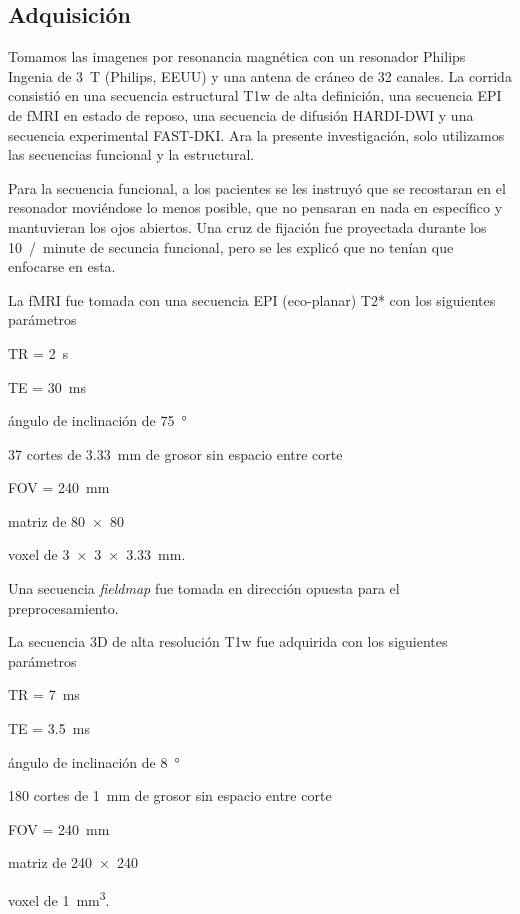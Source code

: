 \subsection{Adquisición}
Tomamos las imagenes por resonancia magnética con un resonador Philips Ingenia de \SI{3}{\tesla} (Philips, EEUU) y una antena de cráneo de 32 canales. La corrida consistió en una secuencia estructural T1w de alta definición, una secuencia EPI de fMRI en estado de reposo, una secuencia de difusión HARDI-DWI y una secuencia experimental FAST-DKI. Ara la presente investigación, solo utilizamos las secuencias funcional y la estructural.\par
Para la secuencia funcional, a los pacientes se les instruyó que se recostaran en el resonador moviéndose lo menos posible, que no pensaran en nada en específico y mantuvieran los ojos abiertos. Una cruz de fijación fue proyectada durante los \SI{10}{/minute} de secuncia funcional, pero se les explicó que no tenían que enfocarse en esta. \par
La fMRI fue tomada con una secuencia EPI (eco-planar) T2* con los siguientes parámetros
\begin{enumerate*}[label=\emph{\alph*}), before=\unskip{: }, itemjoin={{; }}, itemjoin*={{, y }}]
    \item TR = \SI{2}{\second}
    \item TE = \SI{30}{\milli\second}
    \item ángulo de inclinación de \SI{75}{\degree}
    \item 37 cortes de \SI{3.33}{\milli\meter} de grosor sin espacio entre corte
    \item FOV = \SI{240}{\milli\meter}
    \item matriz de \num{80x80}
    \item voxel de \SI[product-units=single]{3x3x3.33}{\milli\meter}.
\end{enumerate*}
Una secuencia \textit{fieldmap} fue tomada en dirección opuesta para el preprocesamiento.\par
La secuencia 3D de alta resolución T1w fue adquirida con los siguientes parámetros
\begin{enumerate*}[label=\emph{\alph*}), before=\unskip{: }, itemjoin={{; }}, itemjoin*={{, y }}]
    \item TR = \SI{7}{\milli\second}
    \item TE = \SI{3.5}{\milli\second}
    \item ángulo de inclinación de \SI{8}{\degree}
    \item 180 cortes de \SI{1}{\milli\meter} de grosor sin espacio entre corte
    \item FOV = \SI{240}{\milli\meter}
    \item matriz de \num{240x240}
    \item voxel de \SI[product-units=single]{1}{\milli\meter\cubed}.
\end{enumerate*}

